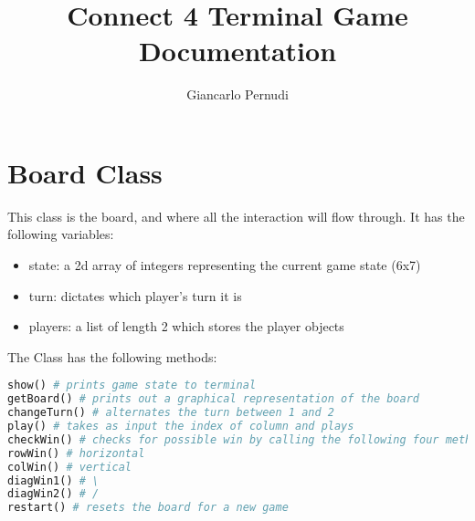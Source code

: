 \documentclass[12pt]{article}
\title{Connect 4 Terminal Game Documentation}
\author{Giancarlo Pernudi}
\begin{document}
\maketitle





\section{Board Class}

This class is the board, and where all the interaction will flow through. It has the following variables:
\begin{itemize}
  \item state: a 2d array of integers representing the current game state (6x7)
  \item turn: dictates which player's turn it is
  \item players: a list of length 2 which stores the player objects
\end{itemize}


The Class has the following methods:
\begin{lstlisting}[language=Python]
show() # prints game state to terminal
getBoard() # prints out a graphical representation of the board
changeTurn() # alternates the turn between 1 and 2
play() # takes as input the index of column and plays
checkWin() # checks for possible win by calling the following four methods:
rowWin() # horizontal
colWin() # vertical
diagWin1() # \
diagWin2() # /
restart() # resets the board for a new game
\end{lstlisting}
\end{document}
